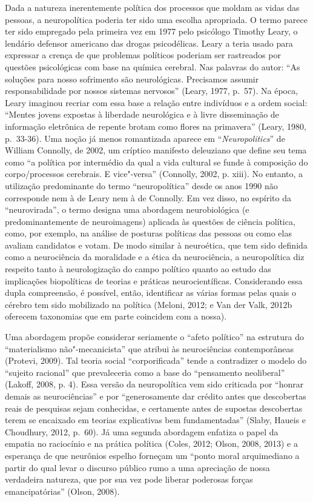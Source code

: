 Dada a natureza inerentemente política dos processos que moldam as vidas
das pessoas, a neuropolítica poderia ter sido uma escolha apropriada. O
termo parece ter sido empregado pela primeira vez em 1977 pelo psicólogo
Timothy Leary, o lendário defensor americano das drogas psicodélicas.
Leary a teria usado para expressar a crença de que problemas políticos
poderiam ser rastreados por questões psicológicas com base na química
cerebral. Nas palavras do autor: ``As soluções para nosso sofrimento são
neurológicas. Precisamos assumir responsabilidade por nossos sistemas
nervosos'' (Leary, 1977, p.~57). Na época, Leary imaginou recriar com
essa base a relação entre indivíduos e a ordem social: ``Mentes jovens
expostas à liberdade neurológica e à livre disseminação de informação
eletrônica de repente brotam como flores na primavera'' (Leary, 1980,
p.~33-36). Uma noção já menos romantizada aparece em
``\emph{Neuropolitics}'' de William Connolly, de 2002, um críptico
manifesto deleuziano que define seu tema como ``a política por
intermédio da qual a vida cultural se funde à composição do
corpo/processos cerebrais. E vice"-versa'' (Connolly, 2002, p. xiii). No
entanto, a utilização predominante do termo ``neuropolítica'' desde os
anos 1990 não corresponde nem à de Leary nem à de Connolly. Em vez
disso, no espírito da ``neurovirada'', o termo designa uma abordagem
neurobiológica (e predominantemente de neuroimagens) aplicada às
questões de ciência política, como, por exemplo, na análise de posturas
políticas das pessoas ou como elas avaliam candidatos e votam. De modo
similar à neuroética, que tem sido definida como a neurociência da
moralidade e a ética da neurociência, a neuropolítica diz respeito tanto
à neurologização do campo político quanto ao estudo das implicações
biopolíticas de teorias e práticas neurocientíficas. Considerando essa
dupla compreensão, é possível, então, identificar as várias formas pelas
quais o cérebro tem sido mobilizado na política (Meloni, 2012; e Van der
Valk, 2012b oferecem taxonomias que em parte coincidem com a nossa).

Uma abordagem propõe considerar seriamente o ``afeto político'' na
estrutura do ``materialismo não"-mecanicista'' que atribui às
neurociências contemporâneas (Protevi, 2009). Tal teoria social
``corporificada'' tende a contradizer o modelo do ``sujeito racional''
que prevaleceria como a base do ``pensamento neoliberal'' (Lakoff, 2008,
p. 4). Essa versão da neuropolítica vem sido criticada por ``honrar
demais as neurociências'' e por ``generosamente dar crédito antes que
descobertas reais de pesquisas sejam conhecidas, e certamente antes de
supostas descobertas terem se encaixado em teorias explicativas bem
fundamentadas'' (Slaby, Haueis e Choudhury, 2012, p.~60). Já uma segunda
abordagem enfatiza o papel da empatia no raciocínio e na prática
política (Coles, 2012; Olson, 2008, 2013) e a esperança de que neurônios
espelho forneçam um ``ponto moral arquimediano a partir do qual levar o
discurso público rumo a uma apreciação de nossa verdadeira natureza, que
por sua vez pode liberar poderosas forças emancipatórias'' (Olson,
2008).


